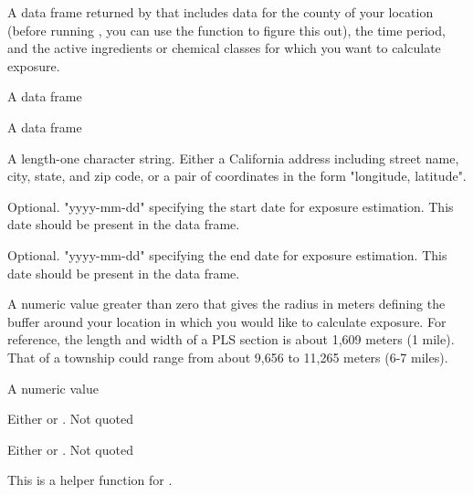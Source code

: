 \documentclass[a4paper]{book}
\begin{document}
\begin{Arguments}
\begin{ldescription}
\item[\code{clean\_pur\_df}] A data frame returned by  that
includes data for the county of your location (before running
, you can use the 
function to figure this out), the time period, and the active ingredients
or chemical classes for which you want to calculate exposure.

\item[\code{pls\_percents}] A data frame

\item[\code{pur\_out}] A data frame

\item[\code{location}] A length-one character string. Either a California address
including street name, city, state, and zip code, or a pair of coordinates
in the form "longitude, latitude".

\item[\code{start\_date}] Optional. "yyyy-mm-dd" specifying the start date for
exposure estimation. This date should be present in the 
data frame.

\item[\code{end\_date}] Optional. "yyyy-mm-dd" specifying the end date for exposure
estimation. This date should be present in the 
data frame.

\item[\code{radius}] A numeric value greater than zero that gives the radius in meters
defining the buffer around your location in which you would like to
calculate exposure. For reference, the length and width of a PLS section is
about 1,609 meters (1 mile). That of a township could range from about
9,656 to 11,265 meters (6-7 miles).

\item[\code{buffer\_area}] A numeric value

\item[\code{mtrs\_mtr}] Either  or . Not quoted

\item[\code{section\_township}] Either  or . Not quoted
\end{ldescription}
\end{Arguments}
%
\begin{Details}\relax
This is a helper function for .
\end{Details}
\end{document}

